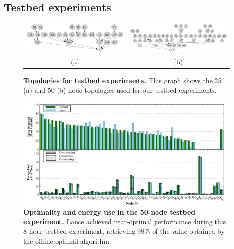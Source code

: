 
\subsection{Testbed experiments}
\label{lance-sec-eval-policies}

\begin{figure}[t]
\label{lance-sec-eval-topologies}
\begin{center}
\begin{tabular}{cc}
\includegraphics[width=0.45\hsize]{./4-lance/figs/gwa/topologies/25.pdf} &
\includegraphics[width=0.45\hsize]{./4-lance/figs/gwa/topologies/50.pdf} \\
(a) &
(b)\\
\end{tabular}
\end{center}
\caption{\textbf{Topologies for testbed experiments.}
This graph shows the 25 (a) and 50 (b) node topologies used for our testbed
experiments.}
\end{figure}

\begin{figure}[t]
\label{lance-sec-eval-figvolcano}
\begin{center}
\includegraphics[width=1.0\hsize]{./4-lance/figs/gwa/big/FIGURE.pdf}
\end{center}
\caption{\textbf{Optimality and energy use in the 50-node testbed
experiment.}
Lance achieved near-optimal performance during this 8-hour testbed
experiment, retrieving 98\% of the value obtained by the offline optimal
algorithm.}
\end{figure}

